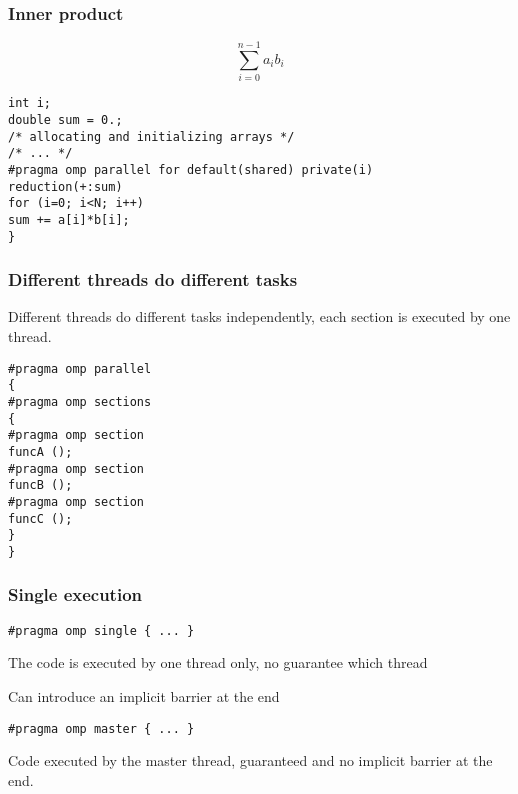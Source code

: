 \documentclass{beamer}
\begin{document}
\begin{frame}
\frametitle{Inner product}

\begin{block}{}
\[
\sum_{i=0}^{n-1} a_ib_i
\]
\begin{verbatim}
int i;
double sum = 0.;
/* allocating and initializing arrays */
/* ... */
#pragma omp parallel for default(shared) private(i) 
reduction(+:sum)
for (i=0; i<N; i++)
sum += a[i]*b[i];
}
\end{verbatim}


\end{block}
\end{frame}

\begin{frame}
\frametitle{Different threads do different tasks}

\begin{block}{}

Different threads do different tasks independently, each section is executed by one thread.
\begin{verbatim}
#pragma omp parallel
{
#pragma omp sections
{
#pragma omp section
funcA ();
#pragma omp section
funcB ();
#pragma omp section
funcC ();
}
}
\end{verbatim}

\end{block}
\end{frame}

\begin{frame}
\frametitle{Single execution}

\begin{block}{}
\begin{verbatim}
#pragma omp single { ... }
\end{verbatim}
The code is executed by one thread only, no guarantee which thread

Can introduce an implicit barrier at the end
\begin{verbatim}
#pragma omp master { ... }
\end{verbatim}
Code executed by the master thread, guaranteed and no implicit barrier at the end.
\end{block}
\end{frame}
\end{document}
